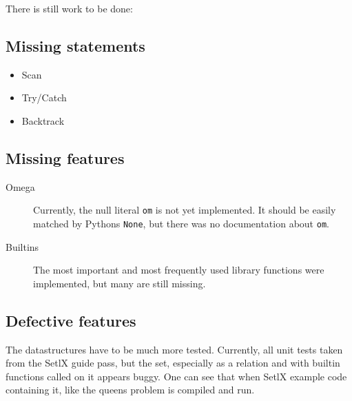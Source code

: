 \documentclass[a4paper,11pt]{article}
\begin{document}
There is still work to be done:

\subsection{Missing statements}

\begin{itemize}
  \item Scan
  \item Try/Catch
  \item Backtrack
\end{itemize}

\subsection{Missing features}

\begin{description}
  \item[Omega] Currently, the null literal \texttt{om} is not yet implemented. It should be easily matched by Pythons \texttt{None}, but there was no documentation about \texttt{om}.
  \item[Builtins] The most important and most frequently used library functions were implemented, but many are still missing.
\end{description}

\subsection{Defective features}

The datastructures have to be much more tested. Currently, all unit tests taken from the SetlX guide pass, but the set, especially as a relation and with builtin functions called on it appears buggy. One can see that when SetlX example code containing it, like the queens problem is compiled and run.


\clearpage
\nocite{*}

\printbibliography 
\end{document}
